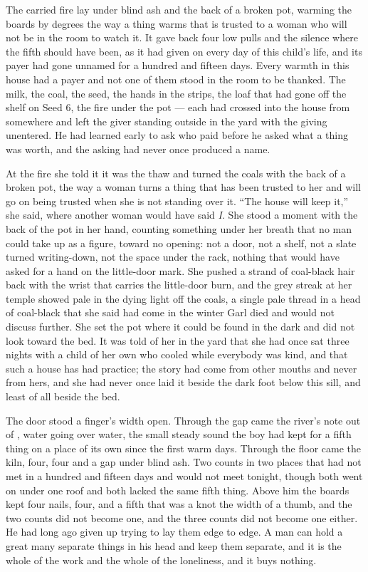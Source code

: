The carried fire lay under blind ash and the back of a broken pot, warming the boards by degrees the way a thing warms that is trusted to a woman who will not be in the room to watch it. It gave back four low pulls and the silence where the fifth should have been, as it had given on every day of this child's life, and its payer had gone unnamed for a hundred and fifteen days. Every warmth in this house had a payer and not one of them stood in the room to be thanked. The milk, the coal, the seed, the hands in the strips, the loaf that had gone off the shelf on Seed 6, the fire under the pot --- each had crossed into the house from somewhere and left the giver standing outside in the yard with the giving unentered. He had learned early to ask who paid before he asked what a thing was worth, and the asking had never once produced a name.

At the fire she told it it was the thaw and turned the coals with the back of a broken pot, the way a woman turns a thing that has been trusted to her and will go on being trusted when she is not standing over it. “The house will keep it,” she said, where another woman would have said \emph{I}. She stood a moment with the back of the pot in her hand, counting something under her breath that no man could take up as a figure, toward no opening: not a door, not a shelf, not a slate turned writing-down, not the space under the rack, nothing that would have asked for a hand on the little-door mark. She pushed a strand of coal-black hair back with the wrist that carries the little-door burn, and the grey streak at her temple showed pale in the dying light off the coals, a single pale thread in a head of coal-black that she said had come in the winter Garl died and would not discuss further. She set the pot where it could be found in the dark and did not look toward the bed. It was told of her in the yard that she had once sat three nights with a child of her own who cooled while everybody was kind, and that such a house has had practice; the story had come from other mouths and never from hers, and she had never once laid it beside the dark foot below this sill, and least of all beside the bed.

The door stood a finger's width open. Through the gap came the river's note out of , water going over water, the small steady sound the boy had kept for a fifth thing on a place of its own since the first warm days. Through the floor came the kiln, four, four and a gap under blind ash. Two counts in two places that had not met in a hundred and fifteen days and would not meet tonight, though both went on under one roof and both lacked the same fifth thing. Above him the boards kept four nails, four, and a fifth that was a knot the width of a thumb, and the two counts did not become one, and the three counts did not become one either. He had long ago given up trying to lay them edge to edge. A man can hold a great many separate things in his head and keep them separate, and it is the whole of the work and the whole of the loneliness, and it buys nothing.

